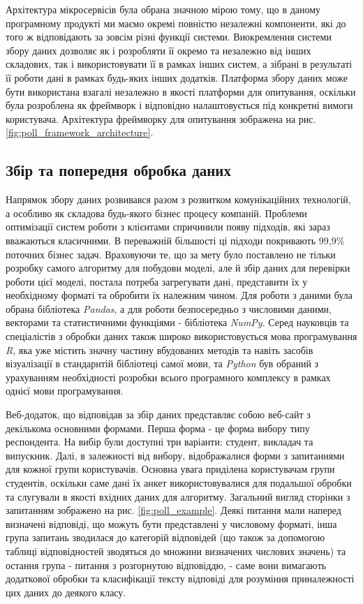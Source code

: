 Архітектура мікросервісів була обрана значною мірою тому, що в даному програмному продукті ми маємо окремі повністю незалежні компоненти, які до того ж відповідають за зовсім різні функції системи. Виокремлення системи збору даних дозволяє як і розробляти її окремо та незалежно від інших складових, так і використовувати її в рамках інших систем, а зібрані в результаті її роботи дані в рамках будь-яких інших додатків. Платформа збору даних може бути використана взагалі незалежно в якості платформи для опитування, оскільки була розроблена як фреймворк і відповідно налаштовується під конкретні вимоги користувача. Архітектура фреймворку для опитування зображена на рис. \ref{fig:poll_framework_architecture}.

\subsection{Збір та попередня обробка даних}
Напрямок збору даних розвивався разом з розвитком комунікаційних технологій, а особливо як складова будь-якого бізнес процесу компаній. Проблеми оптимізації систем роботи з клієнтами спричинили появу підходів, які зараз вважаються класичними. В переважній більшості ці підходи покривають 99,9\% поточних бізнес задач. Враховуючи те, що за мету було поставлено не тільки розробку самого алгоритму для побудови моделі, але й збір даних для перевірки роботи цієї моделі, постала потреба загрегувати дані, представити їх у необхідному форматі та обробити їх належним чином. Для роботи з даними була обрана бібліотека \textit{Pandas}, а для роботи безпосередньо з числовими даними, векторами та статистичними функціями - бібліотека \textit{NumPy}. Серед науковців та спеціалістів з обробки даних також широко використовується мова програмування \textit{R}, яка уже містить значну частину вбудованих методів та навіть засобів візуалізації в стандарнтій бібліотеці самої мови, та \textit{Python} був обраний з урахуванням необхідності розробки всього програмного комплексу в рамках однієї мови програмування.

Веб-додаток, що відповідав за збір даних представляє собою веб-сайт з декількома основними формами. Перша форма - це форма вибору типу респондента. На вибір були доступні три варіанти: студент, викладач та випускник. Далі, в залежності від вибору, відображалися форми з запитаннями для кожної групи користувачів. Основна увага приділена користувачам групи студентів, оскільки саме дані їх анкет використовувалися для подальшої обробки та слугували в якості вхідних даних для алгоритму. Загальний вигляд сторінки з запитанням зображено на рис. \ref{fig:poll_example}. Деякі питання мали наперед визначені відповіді, що можуть бути представлені у числовому форматі, інша група запитань зводилася до категорій відповідей (що також за допомогою таблиці відповідностей зводяться до множини визначених числових значень) та остання група - питання з розгорнутою відповіддю, - саме вони вимагають додаткової обробки та класифікації тексту відповіді для розуміння приналежності цих даних до деякого класу.


